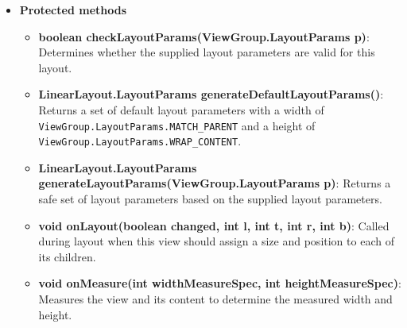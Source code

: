 \documentclass{report}
\begin{document}
\begin{itemize}
        \item \textbf{Protected methods}
            \begin{itemize}
                \item \textbf{boolean checkLayoutParams(ViewGroup.LayoutParams p)}: Determines whether the supplied layout parameters are valid for this layout.
                \item \textbf{LinearLayout.LayoutParams generateDefaultLayoutParams()}: Returns a set of default layout parameters with a width of \texttt{ViewGroup.LayoutParams.MATCH\_PARENT} and a height of \texttt{ViewGroup.LayoutParams.WRAP\_CONTENT}.
                \item \textbf{LinearLayout.LayoutParams generateLayoutParams(ViewGroup.LayoutParams p)}: Returns a safe set of layout parameters based on the supplied layout parameters.
                \item \textbf{void onLayout(boolean changed, int l, int t, int r, int b)}: Called during layout when this view should assign a size and position to each of its children.
                \item \textbf{void onMeasure(int widthMeasureSpec, int heightMeasureSpec)}: Measures the view and its content to determine the measured width and height.
            \end{itemize}

    \end{itemize}

    \pagebreak 
\end{document}
